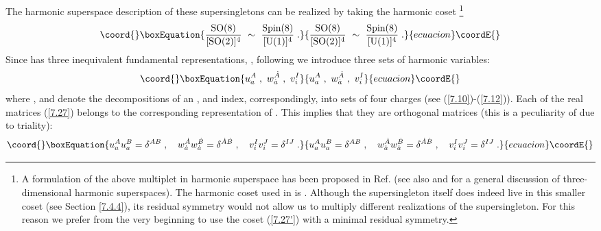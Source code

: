\documentclass[a4paper,12pt]{article}
\begin{document}
The harmonic superspace description of these supersingletons can 
be realized by taking the harmonic coset \footnote{A formulation 
of the above multiplet in harmonic superspace has been proposed 
in Ref. \cite{Howe} (see also \cite{ZK} and \cite{HL} for a 
general discussion of three-dimensional harmonic superspaces). 
The harmonic coset used in \cite{Howe} is 
\coordHE{}. Although the supersingleton itself 
does indeed live in this smaller coset (see Section \ref{7.4.4}), 
its residual symmetry \coordHE{} would not allow us to multiply 
different realizations of the supersingleton. For this reason we 
prefer from the very beginning to use the coset (\ref{7.27'}) 
with a minimal residual symmetry.} 
\begin{equation}\coord{}\boxEquation{\label{7.27'}
  {\mbox{SO}(8)\over [\mbox{SO}(2)]^4} \ \sim \ {\mbox{Spin}(8)\over
 [\mbox{U}(1)]^4}\;.
}{{\mbox{SO}(8)\over [\mbox{SO}(2)]^4} \ \sim \ {\mbox{Spin}(8)\over
 [\mbox{U}(1)]^4}\;.
}{ecuacion}\coordE{}\end{equation}  
Since \coordHE{}  has three inequivalent 
fundamental representations, \coordHE{}, following  \cite{GHS} 
we introduce three sets of harmonic variables: 
\begin{equation}\coord{}\boxEquation{\label{7.27}
  u_a^A\;, \ w^{\dot A}_{\dot a}\;, \ v^I_i
}{u_a^A\;, \ w^{\dot A}_{\dot a}\;, \ v^I_i
}{ecuacion}\coordE{}\end{equation}
where \coordHE{}, \coordHE{} and \coordHE{} denote the decompositions of an \coordHE{}, 
\coordHE{} and \coordHE{} index, correspondingly, into sets of four 
\coordHE{} charges (see (\ref{7.10})-(\ref{7.12})). Each of the 
\coordHE{} real matrices (\ref{7.27}) belongs to the 
corresponding representation of \coordHE{}. 
This implies that they are orthogonal matrices (this is a 
peculiarity of \coordHE{} due to triality): 
\begin{equation}\coord{}\boxEquation{\label{7.28}
  u_a^A u_a^B = \delta^{AB}\;, \quad w^{\dot A}_{\dot a} w^{\dot B}_{\dot 
a}  = \delta^{\dot A\dot B}\;, \quad v^I_i v^J_i = \delta^{IJ} \;.
}{u_a^A u_a^B = \delta^{AB}\;, \quad w^{\dot A}_{\dot a} w^{\dot B}_{\dot 
a}  = \delta^{\dot A\dot B}\;, \quad v^I_i v^J_i = \delta^{IJ} \;.
}{ecuacion}\coordE{}\end{equation}
\end{document}
